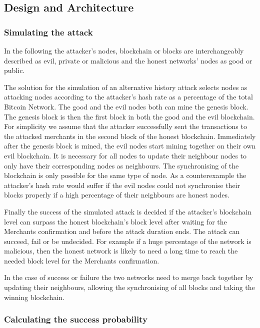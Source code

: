 \subsection{Design and Architecture}

\subsubsection{Simulating the attack}

In the following the attacker's nodes, blockchain or blocks are interchangeably described as evil, private or malicious and the honest networks' nodes as good or public.

The solution for the simulation of an alternative history attack selects nodes as attacking nodes according to the attacker's hash rate as a percentage of the total Bitcoin Network.
The good and the evil nodes both can mine the genesis block. The genesis block is then the first block in both the good and the evil blockchain. For simplicity we assume that the attacker successfully sent the transactions to the attacked merchants in the second block of the honest blockchain. Immediately after the genesis block is mined, the evil nodes start mining together on their own evil blockchain. It is necessary for all nodes to update their neighbour nodes to only have their corresponding nodes as neighbours. The synchronising of the blockchain is only possible for the same type of node. As a counterexample the attacker's hash rate would suffer if the evil nodes could not synchronise their blocks properly if a high percentage of their neighbours are honest nodes.

Finally the success of the simulated attack is decided if the attacker's blockchain level can surpass the honest blockchain's block level after waiting for the Merchants confirmation and before the attack duration ends. The attack can succeed, fail or be undecided. For example if a huge percentage of the network is malicious, then the honest network is likely to need a long time to reach the needed block level for the Merchants confirmation.

In the case of success or failure the two networks need to merge back together by updating their neighbours, allowing the synchronising of all blocks and taking the winning blockchain.

\subsubsection{Calculating the success probability  \cite{doublespending}}

